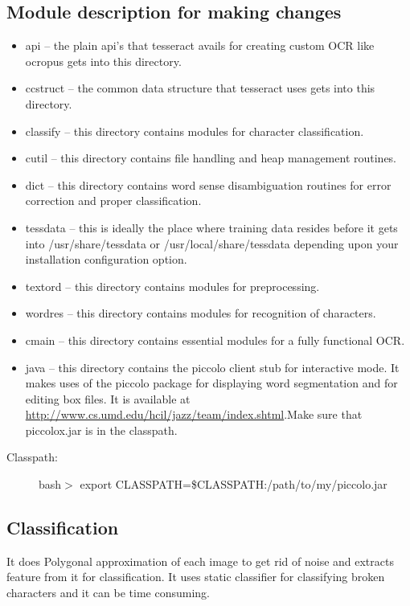 \subsection{Module description for making changes}
\begin{itemize}
	\item api -- the plain api's that tesseract avails for creating custom OCR like ocropus gets into this directory.
	\item ccstruct -- the common data structure that tesseract uses gets into this directory.
	\item classify -- this directory contains modules for character classification.
	\item cutil -- this directory contains file handling and heap management routines.
	\item dict -- this directory contains word sense disambiguation routines for error correction and proper classification.
	\item tessdata -- this is ideally the place where training data resides before it gets into /usr/share/tessdata or /usr/local/share/tessdata 
	depending upon your installation configuration option.
	\item textord -- this directory contains modules for preprocessing.
	\item wordres -- this directory contains modules for recognition of characters.
	\item cmain -- this directory contains essential modules for a fully functional OCR.
	\item java -- this directory contains the piccolo client stub for interactive mode. It makes uses of the piccolo package for displaying word segmentation and for editing box files. It is available at \url{http://www.cs.umd.edu/hcil/jazz/team/index.shtml}.Make sure that piccolox.jar is in the classpath.
\end{itemize}
\begin{description}
\item[Classpath:] bash$>$ export CLASSPATH=\$CLASSPATH:/path/to/my/piccolo.jar
\end{description}

\subsection{Classification}
It does Polygonal approximation of each image to get rid of noise and extracts feature from it for classification. It uses static classifier for classifying broken characters and it can be time consuming.
